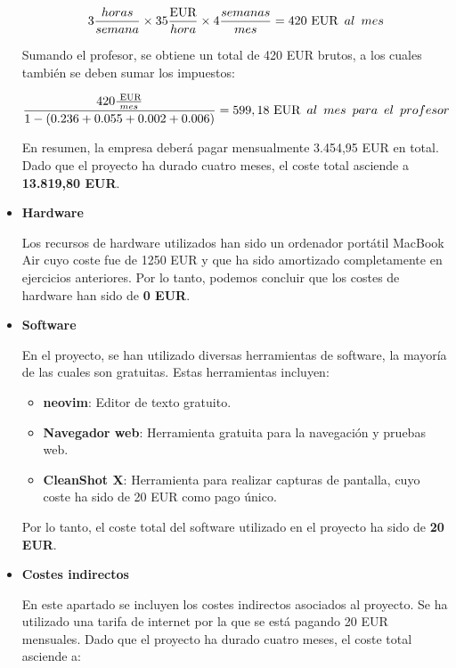 \begin{itemize}
$$ 3\frac{horas}{semana} \times 35\frac{\text{EUR}}{hora} \times 4\frac{semanas}{mes} = 420 \text{ EUR} \hspace{0.5em}al\hspace{0.5em}mes $$

Sumando el profesor, se obtiene un total de 420 EUR brutos, a los cuales también se deben sumar los impuestos:

$$\frac{420\frac{\text{ EUR}}{mes}}{1 - (0.236 + 0.055 + 0.002 + 0.006)} = 599,18 \text{ EUR} \hspace{0.5em}al\hspace{0.5em}mes \hspace{0.5em}para\hspace{0.5em}el\hspace{0.5em}profesor$$

En resumen, la empresa deberá pagar mensualmente 3.454,95 EUR en total. Dado que el proyecto ha durado cuatro meses, el coste total asciende a \textbf{13.819,80 EUR}.

\item \textbf{Hardware}

Los recursos de hardware utilizados han sido un ordenador portátil MacBook Air cuyo coste fue de 1250 EUR y que ha sido amortizado completamente en ejercicios anteriores.
Por lo tanto, podemos concluir que los costes de hardware han sido de \textbf{0 EUR}.

\item \textbf{Software}

En el proyecto, se han utilizado diversas herramientas de software, la mayoría de las cuales son gratuitas. Estas herramientas incluyen:

\begin{itemize}
    \item \textbf{neovim}: Editor de texto gratuito.
    \item \textbf{Navegador web}: Herramienta gratuita para la navegación y pruebas web.
    \item \textbf{CleanShot X}: Herramienta para realizar capturas de pantalla, cuyo coste ha sido de 20 EUR como pago único.
\end{itemize}

Por lo tanto, el coste total del software utilizado en el proyecto ha sido de \textbf{20 EUR}.

\item \textbf{Costes indirectos}

En este apartado se incluyen los costes indirectos asociados al proyecto. Se ha utilizado una tarifa de internet por la que se está pagando 20 EUR mensuales. Dado que el proyecto ha durado cuatro meses, el coste total asciende a:


\end{itemize}
